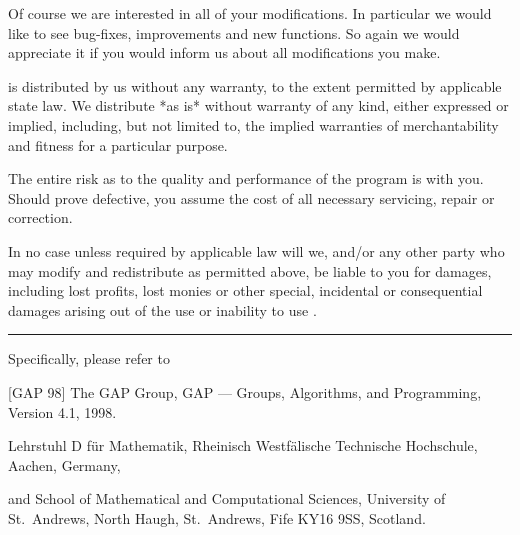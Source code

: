 Of course we are interested in all of your modifications.  In  particular
we would like to see bug-fixes, improvements and new functions.  So again
we would appreciate it if you would inform us about all modifications you
make.

{\GAP} is distributed by us without any warranty, to the extent permitted
by applicable state law.  We  distribute {\GAP} *as is* without  warranty
of any kind, either expressed or implied, including,  but not limited to,
the implied  warranties  of merchantability and  fitness for a particular
purpose.

The entire risk as to the quality and performance of the program is  with
you.  Should {\GAP} prove defective, you assume the cost of all necessary
servicing, repair or correction.

In no  case  unless  required by applicable law will we, and/or any other
party who  may  modify  and  redistribute  {\GAP}  as permitted above, be
liable  to you for damages, including lost profits, lost monies or  other
special, incidental or consequential damages  arising out  of the  use or
inability to use {\GAP}.

\vfill\hrule

\noindent\llap{\*\enspace}Specifically, please refer to

\smallskip \parindent4pc \parskip 0pt
\item{[GAP 98]}
        The GAP Group, GAP --- Groups, Algorithms, and Programming,
        Version 4.1, 1998.
\item{} Lehrstuhl D f\"ur Mathematik,
        Rheinisch Westf\"alische Technische Hochschule, Aachen,
        Germany,
\item{and}
        School of Mathematical and Computational Sciences,
        University of St.~Andrews,\hfill\break
        North Haugh, St.~Andrews, Fife KY16 9SS, Scotland.

\endgroup

